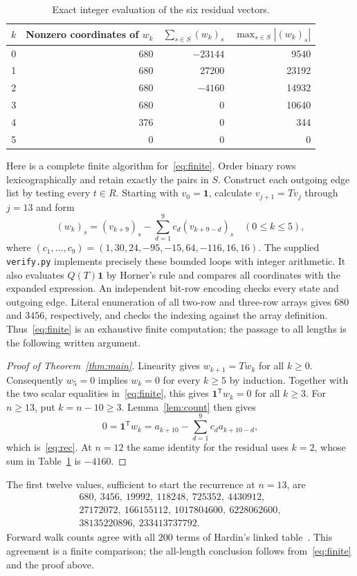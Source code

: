 \documentclass[11pt]{article}
\begin{document}
\begin{table}[ht]
\centering
\begin{tabular}{rrrr}
\toprule
$k$ & Nonzero coordinates of $w_k$ & $\sum_{s\in S}(w_k)_s$
    & $\max_{s\in S}|(w_k)_s|$\\
\midrule
0 & 680 & $-23144$ & 9540\\
1 & 680 & 27200 & 23192\\
2 & 680 & $-4160$ & 14932\\
3 & 680 & 0 & 10640\\
4 & 376 & 0 & 344\\
5 & 0 & 0 & 0\\
\bottomrule
\end{tabular}
\caption{Exact integer evaluation of the six residual vectors.}\label{tab:finite}
\end{table}

Here is a complete finite algorithm for~\eqref{eq:finite}. Order binary
rows lexicographically and retain exactly the pairs in $S$. Construct
each outgoing edge list by testing every $t\in R$. Starting with
$v_0=\mathbf1$, calculate $v_{j+1}=Tv_j$ through $j=13$ and form
\[
 (w_k)_s=(v_{k+9})_s-\sum_{d=1}^9 c_d(v_{k+9-d})_s
 \quad(0\leq k\leq5),
\]
where $(c_1,\ldots,c_9)=(1,30,24,-95,-15,64,-116,16,16)$.
The supplied \texttt{verify.py} implements precisely these bounded
loops with integer arithmetic. It also evaluates $Q(T)\mathbf1$ by
Horner's rule and compares all coordinates with the expanded expression.
An independent bit-row encoding checks every state and outgoing edge.
Literal enumeration of all two-row and three-row arrays gives $680$
and $3456$, respectively, and checks the indexing against the array
definition. Thus~\eqref{eq:finite} is an exhaustive finite computation;
the passage to all lengths is the following written argument.

\begin{proof}[Proof of Theorem~\ref{thm:main}]
Linearity gives $w_{k+1}=Tw_k$ for all $k\geq0$.
Consequently $w_5=0$ implies $w_k=0$ for every $k\geq5$ by induction.
Together with the two scalar equalities in~\eqref{eq:finite}, this gives
$\mathbf1^{\mathsf T}w_k=0$ for all $k\geq3$.
For $n\geq13$, put $k=n-10\geq3$. Lemma~\ref{lem:count} then gives
\[
 0=\mathbf1^{\mathsf T}w_k
   =a_{k+10}-\sum_{d=1}^9c_da_{k+10-d},
\]
which is~\eqref{eq:rec}. At $n=12$ the same identity for the residual
uses $k=2$, whose sum in Table~\ref{tab:finite} is $-4160$.
\end{proof}

The first twelve values, sufficient to start the recurrence at $n=13$, are
\begin{gather*}
680,\ 3456,\ 19992,\ 118248,\ 725352,\ 4430912,\\
27172072,\ 166155112,\ 1017804600,\ 6228062600,\\
38135220896,\ 233413737792.
\end{gather*}
Forward walk counts agree with all $200$ terms of Hardin's linked
table~\cite{hardin765}. This agreement is a finite comparison; the
all-length conclusion follows from~\eqref{eq:finite} and the proof above.
\end{document}
